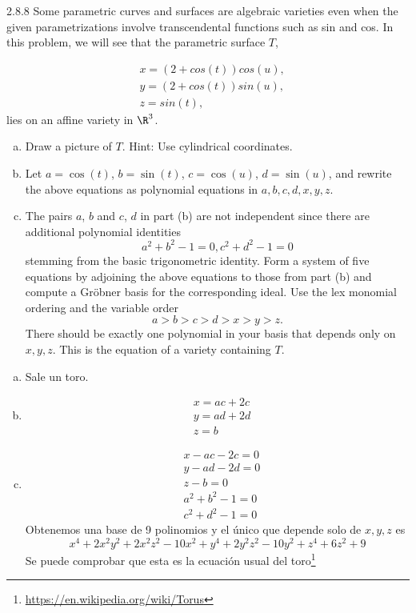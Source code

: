 \documentclass[twoside]{article}
\begin{document}
\begin{ejercicio}{2.8.8}
Some parametric curves and surfaces are algebraic varieties even when the given
parametrizations involve transcendental functions such as sin and cos. In this problem,
we will see that the parametric surface $T$,

\begin{align*}
&x = (2 + cos(t)) cos(u),\\
&y = (2 + cos(t)) sin(u),\\
&z = sin(t),
\end{align*}
lies on an affine variety in $\R^3$.
\begin{enumerate}[a.]
\item Draw a picture of $T$. Hint: Use cylindrical coordinates.
\item Let $a = \cos(t)$, $b = \sin(t)$, $c = \cos(u)$, $d = \sin(u)$, and rewrite the above equations
as polynomial equations in $a, b, c, d, x, y, z$.
\item The pairs $a$, $b$ and $c$, $d$ in part (b) are not independent since there are additional polynomial
identities
$$a^2 + b^2 − 1 = 0, c^2 + d^2 − 1 = 0$$
stemming from the basic trigonometric identity. Form a system of five equations by
adjoining the above equations to those from part (b) and compute a Gröbner basis for
the corresponding ideal. Use the lex monomial ordering and the variable order
$$a > b > c > d > x > y > z.$$
There should be exactly one polynomial in your basis that depends only on $x, y, z$.
This is the equation of a variety containing $T$.
\end{enumerate}
\end{ejercicio}
\begin{solucion}
\begin{enumerate}[a.]
\item Sale un toro.
\item 
\begin{align*}
&x=ac+2c\\
&y=ad+2d\\
&z=b
\end{align*}
\item 
\begin{align*}
&x-ac-2c=0\\
&y-ad-2d=0\\
&z-b=0\\
&a^2 + b^2 − 1 = 0\\
& c^2 + d^2 − 1 = 0
\end{align*}
Obtenemos una base de 9 polinomios y el único que depende solo de $x,y,z$ es
\[
x^4 + 2x^2y^2 + 2x^2z^2 - 10x^2 + y^4 + 2y^2z^2 - 10y^2 + z^4 + 6z^2 + 9
\]
Se puede comprobar que esta es la ecuación usual del toro\footnote{\url{https://en.wikipedia.org/wiki/Torus}}
\end{enumerate}

\end{solucion}
\end{document}

